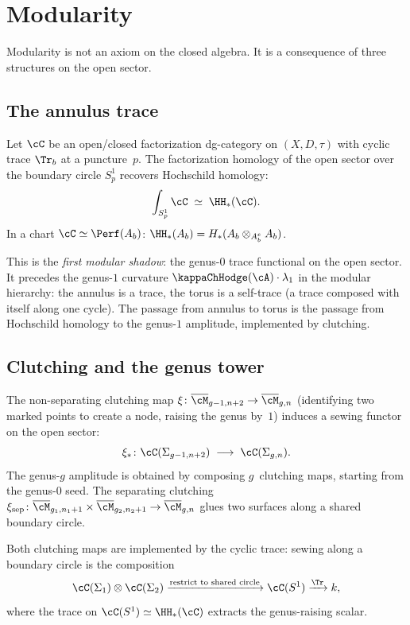 \section{Modularity}
\label{sec:modularity-trace-clutching}

Modularity is not an axiom on the closed algebra.
It is a consequence of three structures on the open sector.

\subsection{The annulus trace}

\begin{theorem}
\label{thm:annulus-trace-v2}
Let $\cC$ be an open/closed factorization dg-category on
$(X, D, \tau)$ with cyclic trace $\Tr_b$ at a puncture~$p$.
The factorization homology of the open sector over the boundary
circle $S^1_p$ recovers Hochschild homology:
\[
 \int_{S^1_p} \cC
 \;\simeq\;
 \HH_*(\cC).
\]
In a chart $\cC \simeq \Perf(A_b)$:
$\HH_*(A_b) = H_*(A_b \otimes_{A_b^e} A_b)$.
\end{theorem}

This is the \emph{first modular shadow}: the genus-$0$ trace
functional on the open sector. It precedes the genus-$1$
curvature $\kappaChHodge(\cA) \cdot \lambda_1$ in the modular hierarchy:
the annulus is a trace, the torus is a self-trace (a trace composed
with itself along one cycle). The passage from annulus to torus is
the passage from Hochschild homology to the genus-$1$ amplitude,
implemented by clutching.

\subsection{Clutching and the genus tower}

\begin{construction}
\label{constr:clutching}
The non-separating clutching map
$\xi \colon \overline{\cM}_{g-1,n+2} \to \overline{\cM}_{g,n}$
(identifying two marked points to create a node, raising the genus
by~$1$) induces a sewing functor on the open sector:
\[
 \xi_* \colon
 \cC(\Sigma_{g-1,n+2})
 \;\longrightarrow\;
 \cC(\Sigma_{g,n}).
\]
The genus-$g$ amplitude is obtained by composing $g$~clutching maps,
starting from the genus-$0$ seed. The separating clutching
$\xi_{\mathrm{sep}} \colon
\overline{\cM}_{g_1,n_1+1} \times \overline{\cM}_{g_2,n_2+1}
\to \overline{\cM}_{g,n}$ glues two surfaces along a shared
boundary circle.

Both clutching maps are implemented by the cyclic trace: sewing
along a boundary circle is the composition
\[
 \cC(\Sigma_1) \otimes \cC(\Sigma_2)
 \xrightarrow{\text{restrict to shared circle}}
 \cC(S^1)
 \xrightarrow{\Tr}
 k,
\]
where the trace on $\cC(S^1) \simeq \HH_*(\cC)$ extracts the
genus-raising scalar.
\end{construction}

